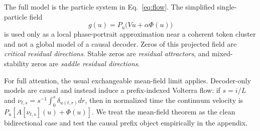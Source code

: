 \documentclass[11pt]{article}
\newcommand{\Sph}{\mathbb{S}}
\begin{document}
The full model is the particle system in Eq.~\eqref{eq:flow}. The simplified
single-particle field
\begin{equation}
g(u)=P_u\big(Vu+\alpha \Phi(u)\big)
\label{eq:single}
\end{equation}
is used only as a local phase-portrait approximation near a coherent token cluster and not a global model of a causal decoder. Zeros of this projected field are \emph{critical residual directions}. Stable zeros are \emph{residual attractors}, and mixed-stability zeros are \emph{saddle residual directions}.








For full attention, the usual exchangeable mean-field limit applies. Decoder-only models are causal and instead induce a prefix-indexed Volterra flow: if $s=i/L$ and $\nu_{t,s}=s^{-1}\int_0^s\delta_{u(t,r)}dr$, then
in normalized time the continuum velocity is $P_u[A[\nu_{t,s}](u)+\Phi(u)]$. We treat the mean-field
theorem as the clean bidirectional case and test the causal prefix object empirically
in the appendix.
\end{document}
